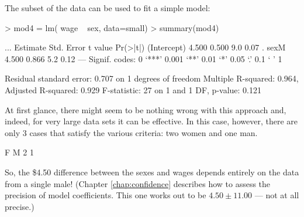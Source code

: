 The subset of the data can be used to fit a simple model:
\begin{Schunk}
\begin{Sinput}
> mod4 = lm( wage ~ sex, data=small)
> summary(mod4)
\end{Sinput}
\begin{Soutput}
...
            Estimate Std. Error t value Pr(>|t|)  
(Intercept)    4.500      0.500     9.0     0.07 .
sexM           4.500      0.866     5.2     0.12  
---
Signif. codes:  0 ‘***’ 0.001 ‘**’ 0.01 ‘*’ 0.05 ‘.’ 0.1 ‘ ’ 1 

Residual standard error: 0.707 on 1 degrees of freedom
Multiple R-squared: 0.964,	Adjusted R-squared: 0.929 
F-statistic:   27 on 1 and 1 DF,  p-value: 0.121 
\end{Soutput}
\end{Schunk}
At first glance, there might seem to be nothing wrong with this
approach and, indeed, for very large data sets it can be effective.
In this case, however, there are only 3 cases that satisfy the various
criteria: two women and one man.
\begin{Schunk}
\begin{Soutput}
F M 
2 1 
\end{Soutput}
\end{Schunk}

So, the \$4.50 difference between
the sexes and wages depends entirely on the data from a single male!
(Chapter \ref{chap:confidence} describes how to assess the precision
of model coefficients.  This one works out to be $4.50 $ ---
not at all precise.)

